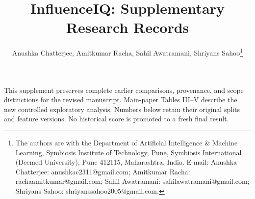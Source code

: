 \documentclass[journal,onecolumn]{IEEEtran}
\begin{document}
\title{InfluenceIQ: Supplementary Research Records}
\author{Anushka Chatterjee, Amitkumar Racha, Sahil Awatramani, Shriyans Sahoo\thanks{The authors are with the Department of Artificial Intelligence \& Machine Learning, Symbiosis Institute of Technology, Pune, Symbiosis International (Deemed University), Pune 412115, Maharashtra, India. E-mail: Anushka Chatterjee: \mbox{anushkac2311@gmail.com}; Amitkumar Racha: \mbox{rachaamitkumar@gmail.com}; Sahil Awatramani: \mbox{sahilawatramani@gmail.com}; Shriyans Sahoo: \mbox{shriyanssahoo2005@gmail.com}.}}
\maketitle
This supplement preserves complete earlier comparisons, provenance, and scope distinctions for the revised manuscript. Main-paper Tables III--V describe the new controlled exploratory analysis. Numbers below retain their original splits and feature versions. No historical score is promoted to a fresh final result.
\end{document}
